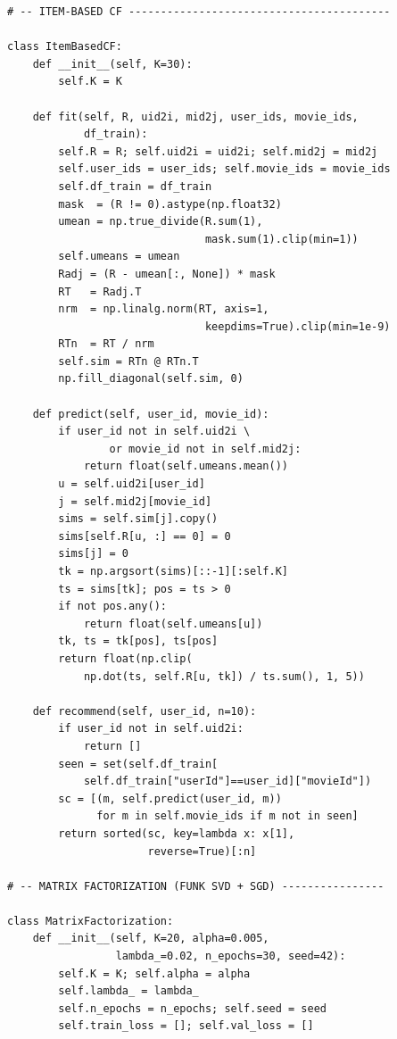 ﻿\documentclass[../BTL.tex]{subfiles}
\begin{document}
\begin{lstlisting}[style=python,
    caption={models.py -- User-based CF / Item-based CF /
              Matrix Factorization / RecommendationSystem facade}]
# -- ITEM-BASED CF -----------------------------------------

class ItemBasedCF:
    def __init__(self, K=30):
        self.K = K

    def fit(self, R, uid2i, mid2j, user_ids, movie_ids,
            df_train):
        self.R = R; self.uid2i = uid2i; self.mid2j = mid2j
        self.user_ids = user_ids; self.movie_ids = movie_ids
        self.df_train = df_train
        mask  = (R != 0).astype(np.float32)
        umean = np.true_divide(R.sum(1),
                               mask.sum(1).clip(min=1))
        self.umeans = umean
        Radj = (R - umean[:, None]) * mask
        RT   = Radj.T
        nrm  = np.linalg.norm(RT, axis=1,
                               keepdims=True).clip(min=1e-9)
        RTn  = RT / nrm
        self.sim = RTn @ RTn.T
        np.fill_diagonal(self.sim, 0)

    def predict(self, user_id, movie_id):
        if user_id not in self.uid2i \
                or movie_id not in self.mid2j:
            return float(self.umeans.mean())
        u = self.uid2i[user_id]
        j = self.mid2j[movie_id]
        sims = self.sim[j].copy()
        sims[self.R[u, :] == 0] = 0
        sims[j] = 0
        tk = np.argsort(sims)[::-1][:self.K]
        ts = sims[tk]; pos = ts > 0
        if not pos.any():
            return float(self.umeans[u])
        tk, ts = tk[pos], ts[pos]
        return float(np.clip(
            np.dot(ts, self.R[u, tk]) / ts.sum(), 1, 5))

    def recommend(self, user_id, n=10):
        if user_id not in self.uid2i:
            return []
        seen = set(self.df_train[
            self.df_train["userId"]==user_id]["movieId"])
        sc = [(m, self.predict(user_id, m))
              for m in self.movie_ids if m not in seen]
        return sorted(sc, key=lambda x: x[1],
                      reverse=True)[:n]

# -- MATRIX FACTORIZATION (FUNK SVD + SGD) ----------------

class MatrixFactorization:
    def __init__(self, K=20, alpha=0.005,
                 lambda_=0.02, n_epochs=30, seed=42):
        self.K = K; self.alpha = alpha
        self.lambda_ = lambda_
        self.n_epochs = n_epochs; self.seed = seed
        self.train_loss = []; self.val_loss = []


\end{lstlisting}
\end{document}
